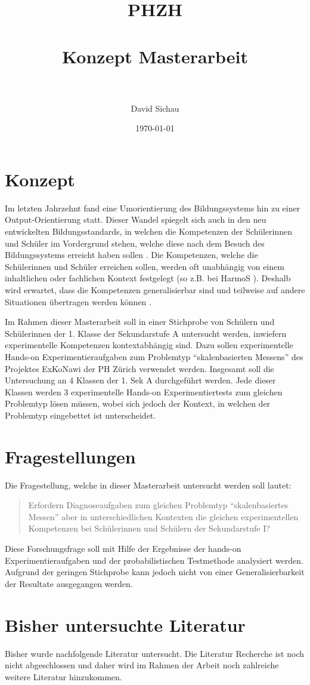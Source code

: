 \documentclass[paper=a4, fontsize=12pt, parskip=half]{scrartcl} %
\title{	
\normalfont \normalsize 
\textsc{PHZH} \\ [0.4cm] %
\horrule{0.5pt} \\[0.3cm] %
\huge Konzept Masterarbeit \\ %
\horrule{2pt} \\[0.4cm] %
}
\author{David Sichau} %
\date{\normalsize\today} %
\begin{document}
\maketitle %

\tableofcontents


\section{Konzept}

Im letzten Jahrzehnt fand eine Umorientierung des Bildungssystems hin zu einer Output-Orientierung statt. Dieser Wandel spiegelt sich auch in den neu entwickelten Bildungsstandards, in welchen die Kompetenzen der Schülerinnen und Schüler im Vordergrund stehen, welche diese nach dem Besuch des Bildungssystems erreicht haben sollen \citep{Oelkers2008}. Die Kompetenzen, welche die Schülerinnen und Schüler erreichen sollen, werden oft unabhängig von einem inhaltlichen oder fachlichen Kontext festgelegt (so z.B. bei HarmoS \citet{KonsotriumHarmoSNaturwissenschaften+2010}). Deshalb wird erwartet, dass die Kompetenzen generalisierbar sind und teilweise auf andere Situationen übertragen werden können \citep{Hartig2006}.

Im Rahmen dieser Masterarbeit soll in einer Stichprobe von Schülern und Schülerinnen der 1. Klasse der Sekundarstufe A untersucht werden, inwiefern experimentelle Kompetenzen kontextabhängig sind. Dazu sollen experimentelle Hands-on Experimentieraufgaben zum Problemtyp "`skalenbasierten Messens"' des Projektes ExKoNawi der PH Zürich \citep{Gut2013a} verwendet werden. Insgesamt soll die Untersuchung an 4 Klassen der 1. Sek A durchgeführt werden. Jede dieser Klassen werden 3 experimentelle Hands-on Experimentiertests zum gleichen Problemtyp lösen müssen, wobei sich jedoch der Kontext, in welchen der Problemtyp eingebettet ist unterscheidet.

\section{Fragestellungen}

Die Fragestellung, welche in dieser Masterarbeit untersucht werden soll lautet:


\begin{quote}
Erfordern Diagnoseaufgaben zum gleichen Problemtyp "`skalenbasiertes Messen"' aber in unterschiedlichen Kontexten die gleichen experimentellen
Kompetenzen bei Schülerinnen und Schülern der Sekundarstufe I?

\end{quote}
Diese Forschungsfrage soll mit Hilfe der Ergebnisse der hands-on Experimentieraufgaben und der probabilistischen Testmethode analysiert werden. Aufgrund der geringen Stichprobe kann jedoch nicht von einer Generalisierbarkeit der Resultate ausgegangen werden.





\section{Bisher untersuchte Literatur}

Bisher wurde nachfolgende Literatur untersucht. Die Literatur Recherche ist noch nicht abgeschlossen und daher wird im Rahmen der Arbeit noch zahlreiche weitere Literatur hinzukommen.



\printbibliography[heading=none]
\end{document}
